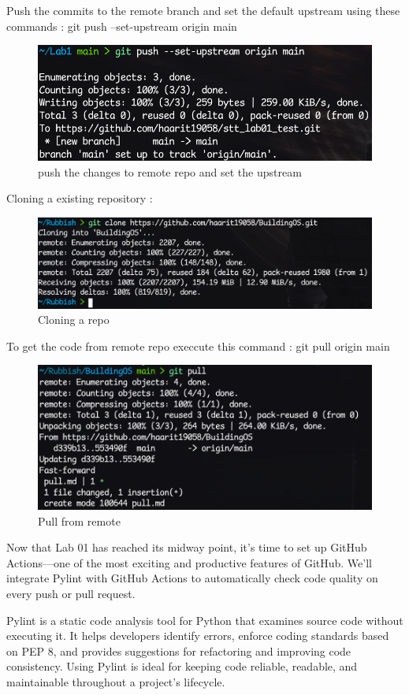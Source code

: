 \documentclass[a4paper,12pt,twoside,english]{all-in-one} %
\begin{document}
Push the commits to the remote branch and set the default upstream using these commands : git push --set-upstream origin main
\begin{figure}[H]
    \centering
    \includegraphics[width=0.75\linewidth]{image10.png}
    \caption{push the changes to remote repo and set the upstream}
    \label{fig:placeholder}
\end{figure}


Cloning a existing repository :
\begin{figure}[H]
    \centering
    \includegraphics[width=0.75\linewidth]{image11.png}
    \caption{Cloning a repo}
    \label{fig:placeholder}
\end{figure}


To get the code from remote repo execcute this command : git pull origin main
\begin{figure}[H]
    \centering
    \includegraphics[width=0.75\linewidth]{image12.png}
    \caption{Pull from remote}
    \label{fig:placeholder}
\end{figure}


Now that Lab 01 has reached its midway point, it's time to set up GitHub Actions—one of the most exciting and productive features of GitHub. We'll integrate Pylint with GitHub Actions to automatically check code quality on every push or pull request.

Pylint is a static code analysis tool for Python that examines source code without executing it. It helps developers identify errors, enforce coding standards based on PEP 8, and provides suggestions for refactoring and improving code consistency. Using Pylint is ideal for keeping code reliable, readable, and maintainable throughout a project's lifecycle.
\end{document}

